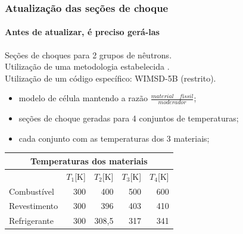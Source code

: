 \documentclass[svgnames,smaller,table]{beamer}
\begin{document}
\begin{frame}
  \frametitle{Atualização das seções de choque}
  \framesubtitle{Antes de atualizar, é preciso \textbf{gerá-las}}
  Seções de choques para 2 grupos de nêutrons.\\
  \vspace{0.2cm}
  Utilização de uma metodologia estabelecida \cite{Reis2015}.\\
  \vspace{0.2cm}
  Utilização de um código específico: WIMSD-5B (\alert{restrito}).\\
  \vspace{0.2cm}
  \begin{itemize}
  \item modelo de célula mantendo a razão $\frac{material\quad físsil}{moderador}$;
  \item seções de choque geradas para 4 conjuntos de temperaturas;
  \item cada conjunto com as temperaturas dos 3 materiais;
  \end{itemize}
  \centering
  \vspace{0.2cm}
  \begin{tabular}{lrrrr}
    \multicolumn{5}{c}{Temperaturas dos materiais}                                                                                                       \\ \hline
    & \multicolumn{1}{l}{$T_1${[}K{]}} & \multicolumn{1}{l}{$T_2${[}K{]}} & \multicolumn{1}{l}{$T_3${[}K{]}} & \multicolumn{1}{l}{$T_4${[}K{]}}      \\ \hline
    Combustível  & 300                             & 400                             & 500                             & 600                             \\ \hline
    Revestimento & 300                             & 396                             & 403                             & 410                             \\ \hline
    Refrigerante & 300                             & 308,5                           & 317                             & 341                            
  \end{tabular}

\end{frame}
\end{document}
